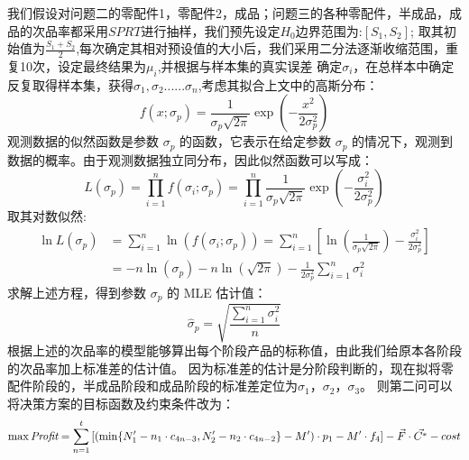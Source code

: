 \documentclass[withoutpreface,bwprint]{cumcmthesis} %
\begin{document}
我们假设对问题二的零配件1，零配件2，成品；问题三的各种零配件，半成品，成品的次品率都采用$SPRT$进行抽样，我们预先设定$H_0$边界范围为:$[S_1,S_2]$;
取其初始值为$\frac{S_1+S_2}{2}$,每次确定其相对预设值的大小后，我们采用二分法逐渐收缩范围，重复10次，设定最终结果为$\mu_i$,并根据与样本集的真实误差
确定$\sigma_i$，在总样本中确定反复取得样本集，获得$\sigma_1,\sigma_2......\sigma_n$,考虑其拟合上文中的高斯分布：
\begin{equation}
	f(x; \sigma_p) = \frac{1}{\sigma_p \sqrt{2\pi}} \exp\left(-\frac{x^2}{2\sigma_p^2}\right)
\end{equation}
观测数据的似然函数是参数 $\sigma_p$ 的函数，它表示在给定参数 $\sigma_p$ 的情况下，观测到数据的概率。由于观测数据独立同分布，因此似然函数可以写成：
\begin{equation}
	L(\sigma_p) = \prod_{i=1}^n f(\sigma_i; \sigma_p) = \prod_{i=1}^n \frac{1}{\sigma_p \sqrt{2\pi}} \exp\left(-\frac{\sigma_i^2}{2\sigma_p^2}\right)
\end{equation}
取其对数似然:
\begin{equation}
	\begin{split}
		\ln L(\sigma_p) &= \sum_{i=1}^n \ln(f(\sigma_i; \sigma_p)) = \sum_{i=1}^n \left[ \ln\left(\frac{1}{\sigma_p \sqrt{2\pi}}\right) - \frac{\sigma_i^2}{2\sigma_p^2} \right] \\
		&= -n \ln(\sigma_p) - n \ln(\sqrt{2\pi}) - \frac{1}{2\sigma_p^2} \sum_{i=1}^n \sigma_i^2
	\end{split}
\end{equation}
求解上述方程，得到参数 $\sigma_p$ 的 MLE 估计值：
\begin{equation}
	\hat{\sigma}_p = \sqrt{\frac{\sum_{i=1}^n \sigma_i^2}{n}}
\end{equation}
根据上述的次品率的模型能够算出每个阶段产品的标称值，由此我们给原本各阶段的次品率加上标准差的估计值。
因为标准差的估计是分阶段判断的，现在拟将零配件阶段的，半成品阶段和成品阶段的标准差定位为$\sigma_{1}$，$\sigma_{2}$，$\sigma_{3}$。
则第二问可以将决策方案的目标函数及约束条件改为：
$$	\max \textit{Profit}=\sum_{n=1}^{t}\left [  (\min \{N'_{1}-n_{1}\cdot c_{4n-3},N'_{2}-n_{2}\cdot c_{4n-2}\}-M')\cdot p_{1}-M'\cdot f_{4} \right ] -\vec{F}\cdot \vec{C^{*}} -cost\\$$
\end{document}
